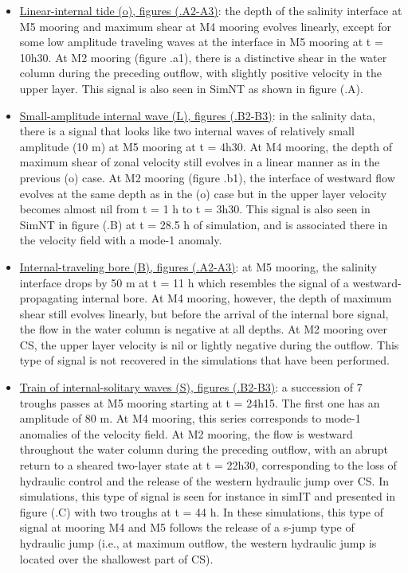 \begin{itemize}
\item \underline{Linear-internal tide (o), figures (.A2-A3)}: the depth of the salinity interface at M5 mooring and maximum shear at M4 mooring evolves linearly, except for some low amplitude traveling waves at the interface in M5 mooring at t = 10h30. At M2 mooring (figure .a1), there is a distinctive shear in the water column during the preceding outflow, with slightly positive velocity in the upper layer. This signal is also seen in SimNT as shown in figure (.A).
%
\item \underline{Small-amplitude internal wave (L), figures (.B2-B3)}: in the salinity data, there is a signal that looks like two internal waves of relatively small amplitude (10 m) at M5 mooring at t = 4h30. At M4 mooring, the depth of maximum shear of zonal velocity still evolves in a linear manner as in the previous (o) case. At M2 mooring (figure .b1), the interface of westward flow evolves at the same depth as in the (o) case but in the upper layer velocity becomes almost nil from t = 1 h to t = 3h30. This signal is also seen in SimNT in figure (.B) at t = 28.5 h of simulation, and is associated there in the velocity field with a mode-1 anomaly.
%
\item \underline{Internal-traveling bore (B), figures (.A2-A3)}: at M5 mooring, the salinity interface drops by 50 m at t = 11 h which resembles the signal of a westward-propagating internal bore. At M4 mooring, however, the depth of maximum shear still evolves linearly, but before the arrival of the internal bore signal, the flow in the water column is negative at all depths. At M2 mooring over CS, the upper layer velocity is nil or lightly negative during the outflow. This type of signal is not recovered in the simulations that have been performed.
%
\item \underline{Train of internal-solitary waves (S), figures (.B2-B3)}: a succession of 7 troughs passes at M5 mooring starting at t = 24h15. The first one has an amplitude of 80 m. At M4 mooring, this series corresponds to mode-1 anomalies of the velocity field. At M2 mooring, the flow is westward throughout the water column during the preceding outflow, with an abrupt return to a sheared two-layer state at t = 22h30, corresponding to the loss of hydraulic control and the release of the western hydraulic jump over CS. In simulations, this type of signal is seen for instance in simIT and presented in figure (.C) with two troughs at  t = 44 h. In these simulations, this type of signal at mooring M4 and M5 follows the release of a s-jump type of hydraulic jump (i.e., at maximum outflow, the western hydraulic jump is located over the shallowest part of CS).

\end{itemize}

